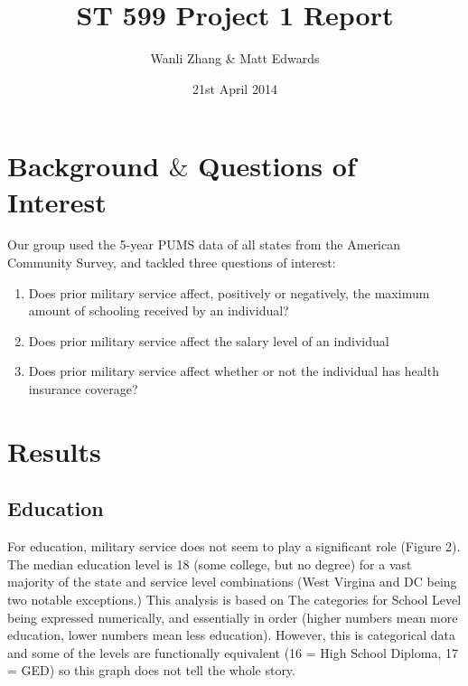 \documentclass{article}
\title{ST 599 Project 1 Report}
\author{Wanli Zhang \& Matt Edwards}
\date{21st April 2014}
\begin{document}
\maketitle %





\section{Background $\&$ Questions of Interest}
Our group used the 5-year PUMS data of all states from the American Community Survey, and tackled three questions of interest:

\begin{enumerate}

\item Does prior military service affect, positively or negatively, the maximum amount of schooling received by an individual? %
\item Does prior military service affect the salary level of an individual
\item Does prior military service affect whether or not the individual has health insurance coverage? 
\end{enumerate}


\section{Results}
\subsection{Education}
For education, military service does not seem to play a significant role (Figure 2). The median education level is 18 (some college, but no degree) for a vast majority of the state and service level combinations (West Virgina and DC being two notable exceptions.) This analysis is based on The categories for School Level being expressed numerically, and essentially in order (higher numbers mean more education, lower numbers mean less education). However, this is categorical data and some of the levels are functionally equivalent (16 = High School Diploma, 17 = GED) so this graph does not tell the whole story.
\end{document}
